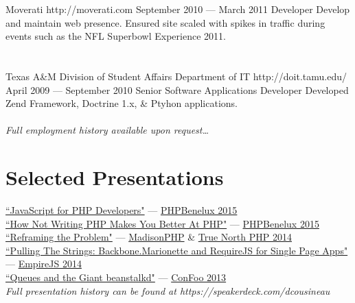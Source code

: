 \documentclass{resume}
\begin{document}
\employer
	{Moverati}
	{http://moverati.com}
	{September 2010 --- March 2011}
	{Developer}
	{Develop and maintain web presence. Ensured site scaled with spikes in traffic during events such as the NFL Superbowl Experience 2011.}
\\ \\ \\
\employer
	{Texas A\&M Division of Student Affairs Department of IT}
	{http://doit.tamu.edu/}
	{April 2009 --- September 2010}
	{Senior Software Applications Developer}
	{Developed Zend Framework, Doctrine 1.x, \& Ptyhon applications.}
\\ \\
\emph{Full employment history available upon request\ldots}

%

\section{Selected Presentations}

\begin{spacing}{1.25}
\href{https://speakerdeck.com/dcousineau/javascript-for-php-developers}{``JavaScript for PHP Developers"} --- \href{https://conference.phpbenelux.eu/2015/}{PHPBenelux 2015}\\
\href{https://speakerdeck.com/dcousineau/how-not-writing-php-makes-you-better-at-php}{``How Not Writing PHP Makes You Better At PHP"} --- \href{https://conference.phpbenelux.eu/2015/}{PHPBenelux 2015}\\
\href{https://speakerdeck.com/dcousineau/reframing-the-problem-truenorthphp-2014}{``Reframing the Problem"} --- \href{http://2014.madisonphpconference.com/schedule/view/19/reframing-the-problem-daniel-cousineau}{MadisonPHP} \& \href{http://truenorthphp.ca/}{True North PHP 2014}\\
\href{https://speakerdeck.com/dcousineau/pulling-the-strings-backbone-dot-marionette-and-require-dot-js-for-single-page-apps}{``Pulling The Strings: Backbone.Marionette and RequireJS for Single Page Apps"} --- \href{http://2014.empirejs.org/#/speakers}{EmpireJS 2014}\\
\href{https://speakerdeck.com/dcousineau/queues-and-the-giant-beanstalkd}{``Queues and the Giant beanstalkd"} --- \href{http://confoo.ca/}{ConFoo 2013}\\
\emph{Full presentation history can be found at https://speakerdeck.com/dcousineau}
\end{spacing}
\end{document}
